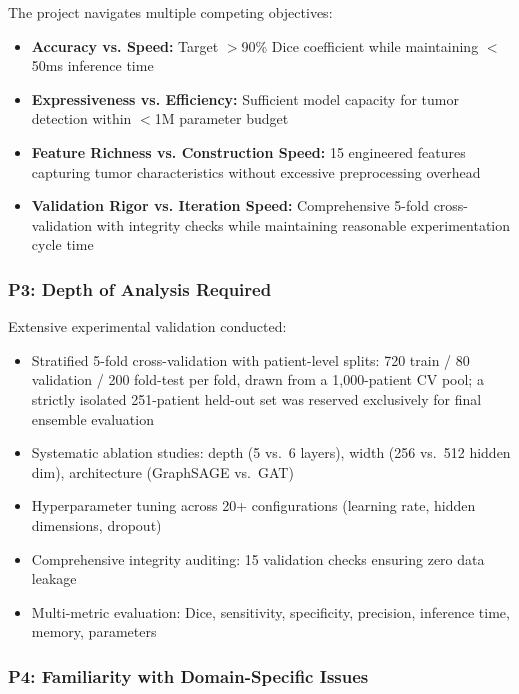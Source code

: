 The project navigates multiple competing objectives:

\begin{itemize}
    \item \textbf{Accuracy vs. Speed:} Target $>$90\% Dice coefficient while maintaining $<$50ms inference time
    \item \textbf{Expressiveness vs. Efficiency:} Sufficient model capacity for tumor detection within $<$1M parameter budget
    \item \textbf{Feature Richness vs. Construction Speed:} 15 engineered features capturing tumor characteristics without excessive preprocessing overhead
    \item \textbf{Validation Rigor vs. Iteration Speed:} Comprehensive 5-fold cross-validation with integrity checks while maintaining reasonable experimentation cycle time
\end{itemize}

\subsubsection*{P3: Depth of Analysis Required}

Extensive experimental validation conducted:

\begin{itemize}
    \item Stratified 5-fold cross-validation with patient-level splits: 720 train / 80 validation / 200 fold-test per fold, drawn from a 1,000-patient CV pool; a strictly isolated 251-patient held-out set was reserved exclusively for final ensemble evaluation
    \item Systematic ablation studies: depth (5 vs.\ 6 layers), width (256 vs.\ 512 hidden dim), architecture (GraphSAGE vs.\ GAT)
    \item Hyperparameter tuning across 20+ configurations (learning rate, hidden dimensions, dropout)
    \item Comprehensive integrity auditing: 15 validation checks ensuring zero data leakage
    \item Multi-metric evaluation: Dice, sensitivity, specificity, precision, inference time, memory, parameters
\end{itemize}

\subsubsection*{P4: Familiarity with Domain-Specific Issues}

